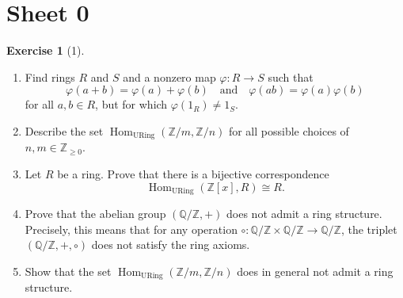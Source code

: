 \documentclass[reqno]{amsart}
\theoremstyle{definition}
\newtheorem{exercise}[theorem]{Exercise}
\theoremstyle{remark}
\DeclareMathOperator{\Hom}{Hom}
\DeclareMathOperator{\URing}{URing}
\begin{document}
\section{Sheet 0}
\begin{exercise}[1]

    \begin{enumerate}
        \item Find rings $R$ and $S$ and a nonzero
            map  $\varphi \colon R \to S$ such that
            \[
            \varphi (a+b) = \varphi (a)+\varphi (b)
            \quad \text{and} \quad
            \varphi (ab) = \varphi (a) \varphi (b)
            \] 
            for all $a,b \in R$, but
            for which $\varphi \left( 1_R \right) \neq 
            1_S$.
        \item Describe the set
            $\Hom_{\URing}
            \left( \mathbb{Z} /m, 
            \mathbb{Z}/n \right) $ for all
            possible choices of
            $n,m \in \mathbb{Z}_{\ge 0}$.
        \item Let $R$ be a ring. Prove that there
            is a bijective correspondence
            \[
            \Hom_{\URing} \left( \mathbb{Z}
            \left[ x \right] ,R\right) \cong R.
            \] 
        \item Prove that the abelian group
            $\left( \mathbb{Q} /\mathbb{Z}, + \right) $ 
            does not admit a ring structure.
            Precisely, this means that for any
            operation
            $\circ \colon \mathbb{Q} / \mathbb{Z}
            \times \mathbb{Q}/\mathbb{Z} \to 
            \mathbb{Q} / \mathbb{Z}$, the triplet
            $\left( \mathbb{Q} /\mathbb{Z},
            +, \circ\right) $ does not satisfy the ring
            axioms.
        \item Show that the set $\Hom_{\URing}
            \left( \mathbb{Z} /m, \mathbb{Z}/n \right) $ 
            does in general not admit a ring structure.
    \end{enumerate}


\end{exercise}
\end{document}
